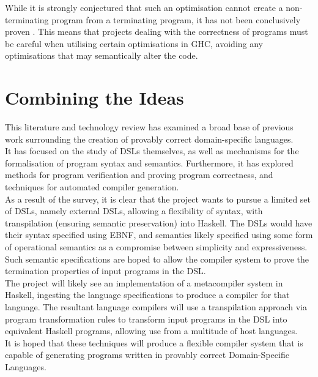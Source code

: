 While it is strongly conjectured that such an optimisation cannot create a non-terminating program from a terminating program, it has not been conclusively proven \citep{voigtlander2008semantics}.
This means that projects dealing with the correctness of programs must be careful when utilising certain optimisations in GHC, avoiding any optimisations that may semantically alter the code.



\section{Combining the Ideas} %
\label{sec:combining_the_ideas}
This literature and technology review has examined a broad base of previous work surrounding the creation of provably correct domain-specific languages.\\

It has focused on the study of DSLs themselves, as well as mechanisms for the formalisation of program syntax and semantics. 
Furthermore, it has explored methods for program verification and proving program correctness, and techniques for automated compiler generation. \\

As a result of the survey, it is clear that the project wants to pursue a limited set of DSLs, namely external DSLs, allowing a flexibility of syntax, with transpilation (ensuring semantic preservation) into Haskell.
The DSLs would have their syntax specified using EBNF, and semantics likely specified using some form of operational semantics as a compromise between simplicity and expressiveness. 
Such semantic specifications are hoped to allow the compiler system to prove the termination properties of input programs in the DSL. \\

The project will likely see an implementation of a metacompiler system in Haskell, ingesting the language specifications to produce a compiler for that language. 
The resultant language compilers will use a transpilation approach via program transformation rules to transform input programs in the DSL into equivalent Haskell programs, allowing use from a multitude of host languages. \\

It is hoped that these techniques will produce a flexible compiler system that is capable of generating programs written in provably correct Domain-Specific Languages.



